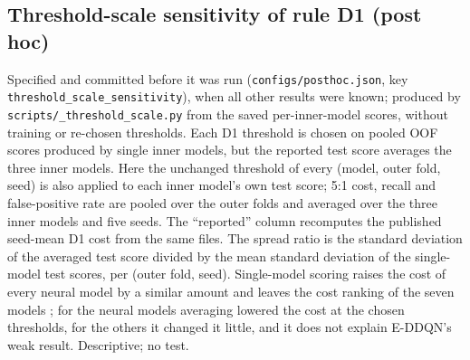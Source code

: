 \subsection{Threshold-scale sensitivity of rule D1 (post hoc)}
Specified and committed before it was run (\texttt{configs/\allowbreak posthoc.json}, key \texttt{threshold\_scale\_sensitivity}), when all other results were known; produced by \texttt{scripts/\_threshold\_scale.py} from the saved per-inner-model scores, without training or re-chosen thresholds. Each D1 threshold is chosen on pooled OOF scores produced by single inner models, but the reported test score averages the three inner models. Here the unchanged threshold of every (model, outer fold, seed) is also applied to each inner model's own test score; 5:1 cost, recall and false-positive rate are pooled over the outer folds and averaged over the three inner models and five seeds. The ``reported'' column recomputes the published seed-mean D1 cost from the same files. The spread ratio is the standard deviation of the averaged test score divided by the mean standard deviation of the single-model test scores, per (outer fold, seed). Single-model scoring raises the cost of every neural model by a similar amount and leaves the cost ranking of the seven models \TSRankUnchanged; for the neural models averaging lowered the cost at the chosen thresholds, for the others it changed it little, and it does not explain E-DDQN's weak result. Descriptive; no test.
\begin{table}[h]
\centering
\caption{Seed-mean D1 results with the reported averaged test score and with single-model test scores (same thresholds). $\Delta$: single model minus reported; pp: percentage points.}
\footnotesize

\end{table}

